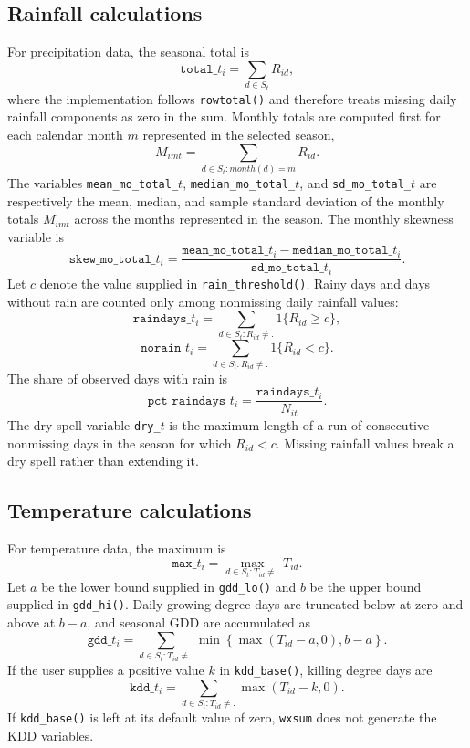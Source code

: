 \subsection{Rainfall calculations}

For precipitation data, the seasonal total is
\[
\texttt{total\_}t_i = \sum_{d\in S_t} R_{id},
\]
where the implementation follows \texttt{rowtotal()} and therefore treats missing daily rainfall components as zero in the sum. Monthly totals are computed first for each calendar month $m$ represented in the selected season,
\[
M_{imt}=\sum_{d\in S_t:month(d)=m} R_{id} .
\]
The variables \texttt{mean\_mo\_total\_}$t$, \texttt{median\_mo\_total\_}$t$, and \texttt{sd\_mo\_total\_}$t$ are respectively the mean, median, and sample standard deviation of the monthly totals $M_{imt}$ across the months represented in the season. The monthly skewness variable is
\[
\texttt{skew\_mo\_total\_}t_i = \frac{\texttt{mean\_mo\_total\_}t_i-\texttt{median\_mo\_total\_}t_i}{\texttt{sd\_mo\_total\_}t_i} .
\]
Let $c$ denote the value supplied in \texttt{rain\_threshold()}. Rainy days and days without rain are counted only among nonmissing daily rainfall values:
\[
\texttt{raindays\_}t_i = \sum_{d\in S_t:R_{id}\ne .} 1\{R_{id}\geq c\},
\]
\[
\texttt{norain\_}t_i = \sum_{d\in S_t:R_{id}\ne .} 1\{R_{id}<c\}.
\]
The share of observed days with rain is
\[
\texttt{pct\_raindays\_}t_i=\frac{\texttt{raindays\_}t_i}{N_{it}}.
\]
The dry-spell variable \texttt{dry\_}$t$ is the maximum length of a run of consecutive nonmissing days in the season for which $R_{id}<c$. Missing rainfall values break a dry spell rather than extending it.

\subsection{Temperature calculations}

For temperature data, the maximum is
\[
\texttt{max\_}t_i=\max_{d\in S_t:T_{id}\ne .} T_{id}.
\]
Let $a$ be the lower bound supplied in \texttt{gdd\_lo()} and $b$ be the upper bound supplied in \texttt{gdd\_hi()}. Daily growing degree days are truncated below at zero and above at $b-a$, and seasonal GDD are accumulated as
\[
\texttt{gdd\_}t_i = \sum_{d\in S_t:T_{id}\ne .} \min\left\{\max\left(T_{id}-a,0\right), b-a\right\} .
\]
If the user supplies a positive value $k$ in \texttt{kdd\_base()}, killing degree days are
\[
\texttt{kdd\_}t_i = \sum_{d\in S_t:T_{id}\ne .} \max\left(T_{id}-k,0\right) .
\]
If \texttt{kdd\_base()} is left at its default value of zero, \texttt{wxsum} does not generate the KDD variables.

